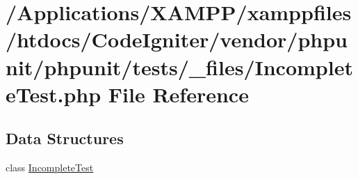 \hypertarget{tests_2__files_2_incomplete_test_8php}{}\section{/\+Applications/\+X\+A\+M\+P\+P/xamppfiles/htdocs/\+Code\+Igniter/vendor/phpunit/phpunit/tests/\+\_\+files/\+Incomplete\+Test.php File Reference}
\label{tests_2__files_2_incomplete_test_8php}
\subsection*{Data Structures}
\begin{DoxyCompactItemize}
\item 
class \mbox{\hyperlink{class_incomplete_test}{Incomplete\+Test}}
\end{DoxyCompactItemize}
